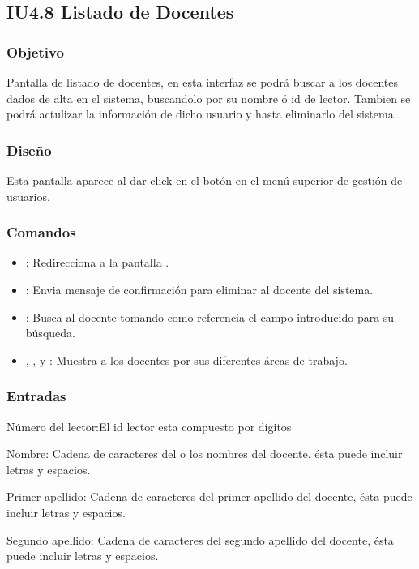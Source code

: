 \newpage
\subsection{IU4.8 Listado de Docentes}

\subsubsection{Objetivo}
	Pantalla de listado de docentes, en esta interfaz se podrá buscar a los docentes  dados de alta en el sistema, buscandolo por su nombre ó id de lector. Tambien se podrá actulizar la información de dicho usuario y hasta eliminarlo del sistema.

\subsubsection{Diseño}
	Esta pantalla aparece al dar click en el botón  en el menú superior de gestión de usuarios.  \\


\subsubsection{Comandos}
	\begin{itemize}
		\item {}: Redirecciona a la pantalla .
		\item {}: Envia mensaje de confirmación para eliminar al docente del sistema.  
		\item {}: Busca al docente tomando como referencia el campo introducido para su búsqueda.  
		\item {}, ,  y : Muestra a los docentes por sus diferentes áreas de trabajo.
	\end{itemize}

\subsubsection{Entradas}
	\begin{Citemize}
		\item Número del lector:El id lector esta compuesto por dígitos
		\item Nombre: Cadena de caracteres del o los nombres del docente, ésta puede incluir letras y espacios. 
		\item Primer apellido: Cadena de caracteres del primer apellido del docente, ésta puede incluir letras y espacios. 
		\item Segundo apellido: Cadena de caracteres del segundo apellido del docente, ésta puede incluir letras y espacios. 
	\end{Citemize}	
